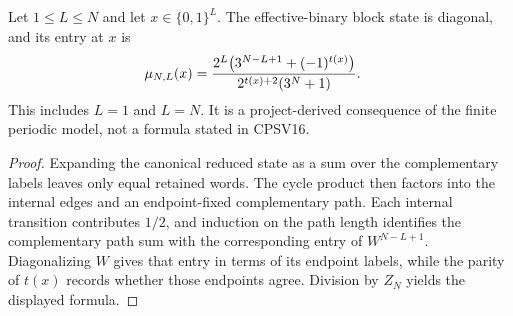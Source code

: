 \begin{lemma}
    \label{thm:cpsv_example411_binary_block_probability}
    \leanok
    Let $1\leq L\leq N$ and let $x\in\{0,1\}^L$.  The effective-binary block
    state is diagonal, and its entry at $x$ is
    \begin{align}
        \mu_{N,L}(x)
         & =\frac{2^L\bigl(3^{N-L+1}+(-1)^{t(x)}\bigr)}
        {2^{t(x)+2}(3^N+1)}.
        \notag
    \end{align}
    This includes $L=1$ and $L=N$.  It is a project-derived consequence of the
    finite periodic model, not a formula stated in CPSV16.
\end{lemma}

\begin{proof}
    \leanok
    Expanding the canonical reduced state as a sum over the complementary
    labels leaves only equal retained words.  The cycle product then factors
    into the internal edges and an endpoint-fixed complementary path.  Each
    internal transition contributes $1/2$, and induction on the path length
    identifies the complementary path sum with the corresponding entry of
    $W^{N-L+1}$.  Diagonalizing $W$ gives that entry in terms of its endpoint
    labels, while the parity of $t(x)$ records whether those endpoints agree.
    Division by $Z_N$ yields the displayed formula.
\end{proof}

